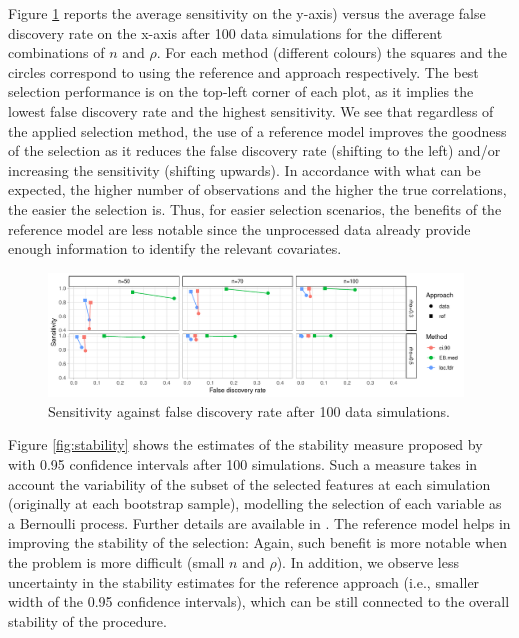 \documentclass[american,]{article}
\theoremstyle{definition}
\begin{document}
Figure \ref{fig:sensitivity_vs_fdr} reports the average sensitivity on the y-axis) versus the average false discovery rate on the x-axis after 100 data simulations for the different combinations of $n$ and $\rho$. For each method (different colours) the squares and the circles correspond to using the reference and approach respectively. The best selection performance is on the top-left corner of each plot, as it implies the lowest false discovery rate and the highest sensitivity. We see that regardless of the applied selection method, the use of a reference model improves the goodness of the selection as it reduces the false discovery rate (shifting to the left) and/or increasing the sensitivity (shifting upwards). In accordance with what can be expected, the higher number of observations and the higher the true correlations, the easier the selection is. Thus, for easier selection scenarios, the benefits of the reference model are less notable since the unprocessed data already provide enough information to identify the relevant covariates.

\begin{figure}[tp]
  \centering
  \includegraphics[width=0.98\textwidth]{graphics/sensitivity_vs_fdr.pdf}
  \caption{Sensitivity against false discovery rate after 100 data simulations.\\}
  \label{fig:sensitivity_vs_fdr}
\end{figure}

Figure \ref{fig:stability} shows the estimates of the stability measure proposed by \cite{paper:stability} with 0.95 confidence intervals after 100 simulations. Such a measure takes in account the variability of the subset of the selected features at each simulation (originally at each bootstrap sample), modelling the selection of each variable as a Bernoulli process. Further details are available in \cite{paper:stability}. The reference model helps in improving the stability of the selection: Again, such benefit is more notable when the problem is more difficult (small $n$ and $\rho$). In addition, we observe less uncertainty in the stability estimates for the reference approach (i.e., smaller width of the 0.95 confidence intervals), which can be still connected to the overall stability of the procedure.
\end{document}

